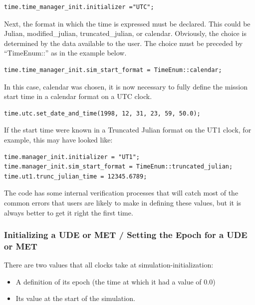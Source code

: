 \begin{verbatim}
time.time_manager_init.initializer ="UTC";
\end{verbatim}




Next, the format in which the time is expressed must be declared.  This
could be Julian, modified\_julian, truncated\_julian, or calendar.
Obviously, the choice is determined by the data available to the user.
The choice must be preceded by
{\textquotedblleft}TimeEnum::{\textquotedblright} as in the example
below.


\begin{verbatim}
time.time_manager_init.sim_start_format = TimeEnum::calendar;
\end{verbatim}

In this case, calendar was chosen, it is now necessary to fully define
the mission start time in a calendar format on a UTC clock.

\begin{verbatim}
time.utc.set_date_and_time(1998, 12, 31, 23, 59, 50.0);
\end{verbatim}

If the start time were known in a Truncated Julian format on the UT1
clock, for example, this may have looked like:

\begin{verbatim}
time.manager_init.initializer = "UT1";
time.manager_init.sim_start_format = TimeEnum::truncated_julian;
time.ut1.trunc_julian_time = 12345.6789;
\end{verbatim}

The code has some internal verification processes that will catch most
of the common errors that users are likely to make in defining these values,
but it is always
better to get it right the first time.



\subsubsection {Initializing a UDE or MET / Setting the Epoch for a UDE or
MET}

There are two values that all clocks take at simulation-initialization:
\begin{itemize}
\item A definition of its epoch (the time at which it had a value of 0.0)
\item Its value at the start of the simulation.
\end{itemize}

